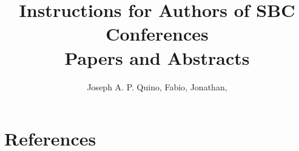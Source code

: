 \documentclass[12pt]{article}
\title{Instructions for Authors of SBC Conferences\\ Papers and Abstracts}
\author{
  Joseph A. P. Quino\inst{1},
  Fabio\inst{1},
  Jonathan\inst{1},
}
\begin{document}
\maketitle







\section{References}

% 
\end{document}
